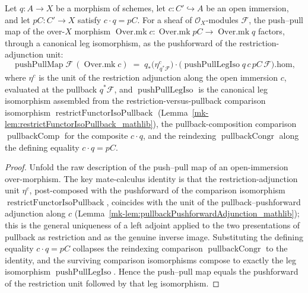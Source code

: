 \begin{lemma}
  \label{mk-lem:pushPull_leg_coherence}

  Let \(q : A \to X\) be a morphism of schemes, let \(c : C' \hookrightarrow A\) be an open
  immersion, and let \(pC : C' \to X\) satisfy \(c \cdot q = pC\). For a sheaf of
  \(\mathcal{O}_X\)-modules \(\mathcal{F}\), the push--pull map of the over-\(X\) morphism
  \(\operatorname{Over.mk} c : \operatorname{Over.mk} pC \to \operatorname{Over.mk} q\) factors,
  through a canonical leg isomorphism, as the pushforward of the restriction-adjunction unit:
  \[
    \operatorname{pushPullMap}\mathcal{F}\,(\operatorname{Over.mk} c)
      \;=\;
    q_*\bigl(\eta^c_{\,q^*\mathcal{F}}\bigr)\cdot
      \bigl(\operatorname{pushPullLegIso} q\,c\,pC\,\mathcal{F}\bigr).\mathrm{hom},
  \]
  where \(\eta^c\) is the unit of the restriction adjunction along the open immersion \(c\),
  evaluated at the pullback \(q^*\mathcal{F}\), and \(\operatorname{pushPullLegIso}\) is the
  canonical leg isomorphism assembled from the restriction-versus-pullback comparison
  isomorphism \(\operatorname{restrictFunctorIsoPullback}\)
  (Lemma~\ref{mk-lem:restrictFunctorIsoPullback_mathlib}), the pullback-composition comparison
  \(\operatorname{pullbackComp}\) for the composite \(c \cdot q\), and the reindexing
  \(\operatorname{pullbackCongr}\) along the defining equality \(c \cdot q = pC\).
\end{lemma}
\begin{proof}
  Unfold the raw description of the push--pull map of an open-immersion over-morphism. The key
  mate-calculus identity is that the restriction-adjunction unit \(\eta^c\), post-composed with the
  pushforward of the comparison isomorphism \(\operatorname{restrictFunctorIsoPullback}\), coincides
  with the unit of the pullback--pushforward adjunction along \(c\)
  (Lemma~\ref{mk-lem:pullbackPushforwardAdjunction_mathlib}); this is the general uniqueness of a left
  adjoint applied to the two presentations of pullback as restriction and as the genuine inverse
  image. Substituting the defining equality \(c \cdot q = pC\) collapses the reindexing comparison
  \(\operatorname{pullbackCongr}\) to the identity, and the surviving comparison isomorphisms compose
  to exactly the leg isomorphism \(\operatorname{pushPullLegIso}\). Hence the push--pull map equals
  the pushforward of the restriction unit followed by that leg isomorphism.
\end{proof}

